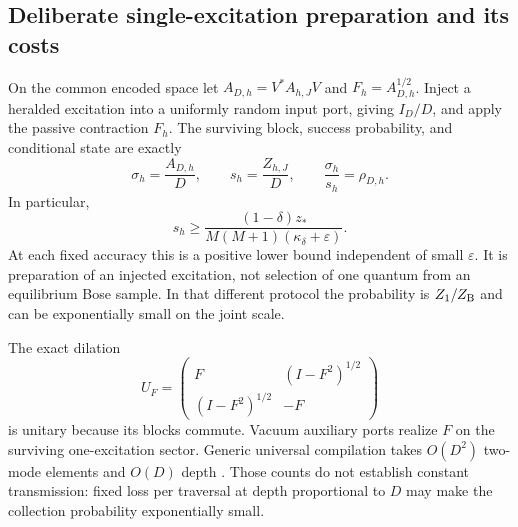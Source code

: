 \documentclass[aps,pra,reprint,superscriptaddress,longbibliography]{revtex4-2}
\begin{document}
\subsection{Deliberate single-excitation preparation and its costs}
\label{sgt:prep:success}

On the common encoded space let $A_{D,h}=V^*A_{h,J}V$ and
$F_h=A_{D,h}^{1/2}$. Inject a heralded excitation into a uniformly
random input port, giving $I_D/D$, and apply the passive contraction
$F_h$. The surviving block, success probability, and conditional state
are exactly
\begin{equation}
 \sigma_h=\frac{A_{D,h}}D,\qquad
 s_h=\frac{Z_{h,J}}D,\qquad
 \frac{\sigma_h}{s_h}=\rho_{D,h}.
 \label{sgt:prep:filter-identity}
\end{equation}
In particular,
\begin{equation}
 s_h\ge
 \frac{(1-\delta)z_*}
 {M(M+1)(\kappa_\delta+\varepsilon)}.
 \label{sgt:prep:success-floor}
\end{equation}
At each fixed accuracy this is a positive lower bound independent of
small $\varepsilon$. It is preparation of an injected excitation,
not selection of one quantum from an equilibrium Bose sample. In that
different protocol the probability is $Z_1/Z_{\rm B}$ and can be
exponentially small on the joint scale.

The exact dilation
\[
 U_F=\begin{pmatrix}
 F&(I-F^2)^{1/2}\\ (I-F^2)^{1/2}&-F
 \end{pmatrix}
\]
is unitary because its blocks commute. Vacuum auxiliary ports realize
$F$ on the surviving one-excitation sector. Generic universal
compilation takes $O(D^2)$ two-mode elements and $O(D)$ depth
\cite{Clements2016}. Those counts do not establish constant
transmission: fixed loss per traversal at depth proportional to $D$
may make the collection probability exponentially small.
\end{document}

